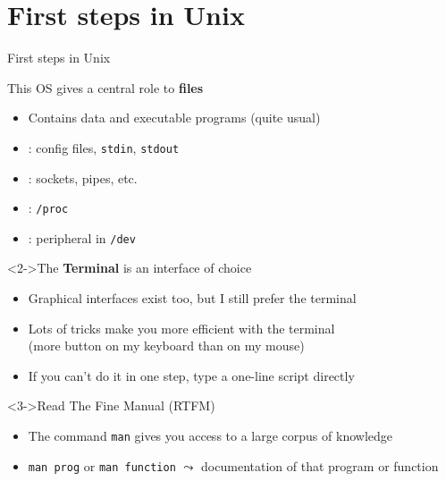 \section{First steps in Unix}\sectionpage
\begin{frame}[squeeze]{First steps in Unix}
  \begin{block}{This OS gives a central role to \textbf{files}}
    \begin{itemize}
    \item Contains data and executable programs (quite usual)
      \medskip
    \item {} : config files,
      \texttt{stdin}, \texttt{stdout}
    \item {}: sockets, pipes, etc.
      \medskip
    \item {}: \texttt{/proc}
    \item {}: peripheral in \texttt{/dev}
    \end{itemize}
  \end{block}

  \begin{block}<2->{The \textbf{Terminal} is an interface of choice}
    \begin{itemize}
    \item Graphical interfaces exist too, but I still prefer the terminal
    \item Lots of tricks make you more efficient with the terminal\\
      (more button on my keyboard than on my mouse)
    \item If you can't do it in one step, type a one-line script directly
    \end{itemize}
  \end{block}

  \begin{block}<3->{Read The Fine Manual (RTFM)}
    \begin{itemize}
    \item The command \texttt{man} gives you access to a large corpus of
      knowledge
    \item \texttt{man prog} or \texttt{man function} $\leadsto$
      documentation of that program or function
    \end{itemize}
  \end{block}
\end{frame}

